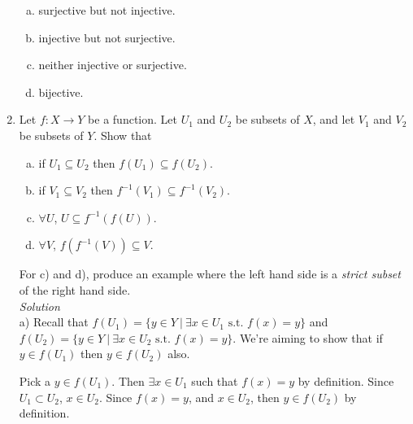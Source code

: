 \documentclass[12pt]{article}
\newif\ifsln
\begin{document}
\begin{enumerate}[1.]
\begin{enumerate}[a)]
	\item  surjective but not injective.
	\item injective but not surjective.
	\item neither injective or surjective.
	\item bijective.
\end{enumerate}

\ifsln
\textit{Solution}\\
a) $f(n) = 1$.\\
b) $f(n) = n + 1$\\
c) $f(1) = 1$, $f(n) = 2$; $n\geq 2$\\
d) $f(n) = n$.
\fi

\item Let $f:X\to Y$ be a function. Let $U_{1}$ and $U_{2}$ be subsets of $X$, and let $V_{1}$ and $V_{2}$ be subsets of $Y$. Show that
\begin{multicols}{2}
	\begin{enumerate}[a)]
		\item if $U_{1} \subseteq U_{2}$ then $f(U_{1}) \subseteq f(U_{2})$.
		\item if $V_{1} \subseteq V_{2}$ then $f^{-1}(V_{1}) \subseteq f^{-1}(V_{2})$.
		\item $\forall U$, $U \subseteq f^{-1}(f(U))$.
		\item $\forall V$, $f(f^{-1}(V)) \subseteq V$.
	\end{enumerate}
\end{multicols}

For c) and d), produce an example where the left hand side is a \emph{strict subset} of the right hand side.\\

\ifsln
\textit{Solution}\\

a) Recall that $f(U_{1}) = \{ y \in Y \ | \ \exists x\in U_{1} \text{ s.t. } f(x) = y\}$ and $f(U_{2}) = \{ y \in Y \ | \ \exists x\in U_{2} \text{ s.t. } f(x) = y\}$. We're aiming to show that if $y \in f(U_{1})$ then $y\in f(U_{2})$ also.\medskip

Pick a $y \in f(U_{1})$. Then $\exists x \in U_{1}$ such that $f(x) = y$ by definition. Since $U_{1} \subset U_{2}$, $x \in U_{2}$. Since $f(x) = y$, and $x\in U_{2}$,  then $y \in f(U_{2})$ by definition. \\


\end{enumerate}
\end{document}
